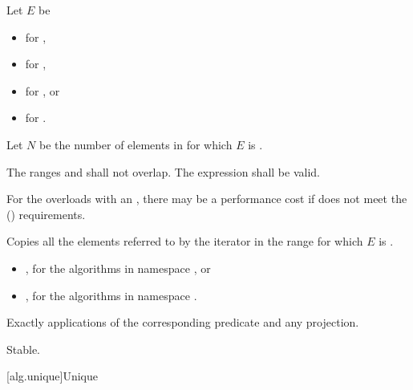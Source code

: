 \begin{itemdescr}
\pnum
Let $E$ be
\begin{itemize}
\item {} for ,
\item {} for ,
\item {} for , or
\item {} for .
\end{itemize}

\pnum
Let $N$ be the number of elements in 
for which $E$ is .

\pnum
\requires
The ranges  and 
shall not overlap. The expression  shall be valid.
\begin{note}
For the overloads with an ,
there may be a performance cost
if  does not meet
the  () requirements.
\end{note}

\pnum
\effects
Copies all the elements referred to by the iterator 
in the range  for which $E$ is .

\pnum
\returns
\begin{itemize}
\item {}, for the algorithms in namespace , or
\item {}, for the algorithms in namespace .
\end{itemize}

\pnum
\complexity
Exactly  applications
of the corresponding predicate and any projection.

\pnum
\remarks
Stable.
\end{itemdescr}

[alg.unique]{Unique}

